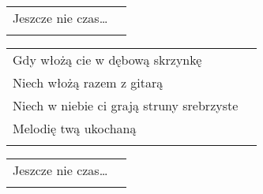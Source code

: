 \documentclass[a5paper]{article}
\begin{document}
\noindent
\begin{tabular}{@{}p{7.50cm}p{3cm}@{}}
Jeszcze nie czas… \\ \\
\end{tabular}

\noindent
\begin{tabular}{@{}p{8.50cm}p{3cm}@{}}
Gdy włożą cie w dębową skrzynkę \\
Niech włożą razem z gitarą \\
Niech w niebie ci grają struny srebrzyste \\
Melodię twą ukochaną \\ \\
\end{tabular}

\noindent
\begin{tabular}{@{}p{7.50cm}p{3cm}@{}}
	Jeszcze nie czas… \\ \\
\end{tabular}
\end{document}
